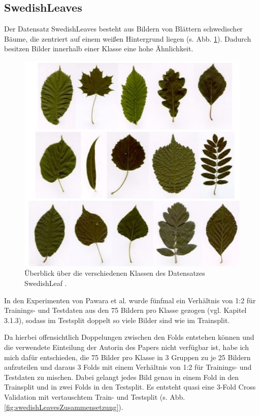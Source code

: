 \subsection{SwedishLeaves}
\label{ch:methodik_SwedishLeaves}
Der Datensatz SwedishLeaves \cite{swedishLeaves} besteht aus Bildern von Blättern schwedischer Bäume, die zentriert auf einem weißen Hintergrund liegen (s. Abb. \ref{fig:swedishLeavesUeberblick}). Dadurch besitzen Bilder innerhalb einer Klasse eine hohe Ähnlichkeit.

\begin{figure}[H]
\centering
\includegraphics[scale=0.8]{img/2_swedishLeaves-image.jpg}
\caption{Überblick über die verschiedenen Klassen des Datensatzes SwedishLeaf \cite{pawaraMonkey}.}
\label{fig:swedishLeavesUeberblick}
\end{figure}

In den Experimenten von Pawara et al. \cite{pawaraPaper} wurde fünfmal ein Verhältnis von 1:2 für Trainings- und Testdaten aus den 75 Bildern pro Klasse gezogen (vgl. \cite{pawaraPaper} Kapitel 3.1.3), sodass im Testsplit doppelt so viele Bilder sind wie im Trainsplit.

Da hierbei offensichtlich Doppelungen zwischen den Folds entstehen können und die verwendete Einteilung der Autorin des Papers \cite{pawaraPaper} nicht verfügbar ist, habe ich mich dafür entschieden, die 75 Bilder pro Klasse in 3 Gruppen zu je 25 Bildern aufzuteilen und daraus 3 Folds mit einem Verhältnis von 1:2 für Trainings- und Testdaten zu mischen. Dabei gelangt jedes Bild genau in einem Fold in den Trainsplit und in zwei Folds in den Testsplit. Es entsteht quasi eine 3-Fold Cross Validation mit vertauschtem Train- und Testsplit (s. Abb. \ref{fig:swedishLeavesZusammensetzung}).

